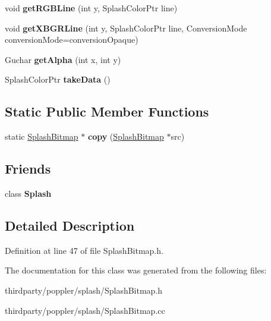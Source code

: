 \begin{DoxyCompactItemize}
void {\bfseries get\+R\+G\+B\+Line} (int y, Splash\+Color\+Ptr line)
\item 
\mbox{\label{class_splash_bitmap_a4cdfdcb3a6b18a5edf9c9cdf32e2e983}} 
void {\bfseries get\+X\+B\+G\+R\+Line} (int y, Splash\+Color\+Ptr line, Conversion\+Mode conversion\+Mode=conversion\+Opaque)
\item 
\mbox{\label{class_splash_bitmap_a7d304d57dd5c614aaf8485c8eb812b9a}} 
Guchar {\bfseries get\+Alpha} (int x, int y)
\item 
\mbox{\label{class_splash_bitmap_a82d282ed76b4986480b2c0f76dacb91f}} 
Splash\+Color\+Ptr {\bfseries take\+Data} ()
\end{DoxyCompactItemize}
\subsection*{Static Public Member Functions}
\begin{DoxyCompactItemize}
\item 
\mbox{\label{class_splash_bitmap_a7472af0b9d586adb6b075d7c5e59e321}} 
static \hyperlink{class_splash_bitmap}{Splash\+Bitmap} $\ast$ {\bfseries copy} (\hyperlink{class_splash_bitmap}{Splash\+Bitmap} $\ast$src)
\end{DoxyCompactItemize}
\subsection*{Friends}
\begin{DoxyCompactItemize}
\item 
\mbox{\label{class_splash_bitmap_a6216f93151b4bec4a72771c40ff08ae8}} 
class {\bfseries Splash}
\end{DoxyCompactItemize}


\subsection{Detailed Description}


Definition at line 47 of file Splash\+Bitmap.\+h.



The documentation for this class was generated from the following files\+:\begin{DoxyCompactItemize}
\item 
thirdparty/poppler/splash/Splash\+Bitmap.\+h\item 
thirdparty/poppler/splash/Splash\+Bitmap.\+cc\end{DoxyCompactItemize}
